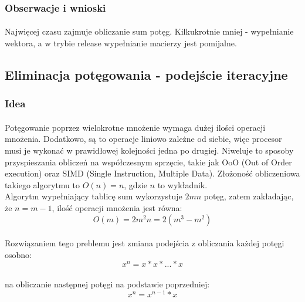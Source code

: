 \documentclass[12pt]{report}
\begin{document}
	\subsubsection{Obserwacje i wnioski}
	\paragraph{}
	Najwięcej czasu zajmuje obliczanie sum potęg. Kilkukrotnie mniej - wypełnianie wektora, a w trybie release wypełnianie macierzy jest pomijalne.
	
	
	\pagebreak
	\subsection{Eliminacja potęgowania - podejście iteracyjne}
	\subsubsection{Idea}
	\paragraph{}
	Potęgowanie poprzez wielokrotne mnożenie wymaga dużej ilości operacji mnożenia.
	Dodatkowo, są to operacje liniowo zależne od siebie, więc procesor musi je wykonać w prawidłowej kolejności jedna po drugiej. Niweluje to sposoby przyspieszania obliczeń na współczesnym sprzęcie, takie jak OoO (Out of Order execution) oraz SIMD (Single Instruction, Multiple Data).
	Złożoność obliczeniowa takiego algorytmu to $O(n) = n$, gdzie $n$ to wykładnik.\\
	Algorytm wypełniający tablicę sum wykorzystuje $2mn$ potęg, zatem zakładając, że $n = m-1$, ilość operacji mnożenia jest równa:
	\begin{equation}
		O(m) = 2m^2n = 2(m^3 - m^2)
	\end{equation}
	\paragraph{}
	Rozwiązaniem tego preblemu jest zmiana podejścia z obliczania każdej potęgi osobno:
	\begin{equation}
		x^n = x*x*...*x
	\end{equation}
	\paragraph{}
	na obliczanie następnej potęgi na podstawie poprzedniej:
	\begin{equation}
		x^n = x^{n-1}*x
	\end{equation}
\end{document}
